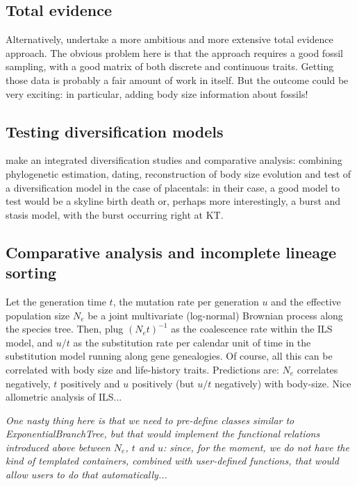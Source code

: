 \documentclass[usletter]{article}
\begin{document}
\subsection{Total evidence}

Alternatively, undertake a more ambitious and more extensive total evidence approach. The obvious problem here is that the approach requires a good fossil sampling, with a good matrix of both discrete and continuous traits. Getting those data is probably a fair amount of work in itself. But the outcome could be very exciting: in particular, adding body size information about fossils!

\subsection{Testing diversification models}

make an integrated diversification studies and comparative analysis: combining phylogenetic estimation, dating, reconstruction of body size evolution and test of a diversification model in the case of placentals: in their case, a good model to test would be a skyline birth death or, perhaps more interestingly, a burst and stasis model, with the burst occurring right at KT.

\subsection{Comparative analysis and incomplete lineage sorting}

Let the generation time $t$, the mutation rate per generation $u$ and the effective population size $N_e$ be a joint multivariate (log-normal) Brownian process along the species tree. Then, plug $(N_e t)^{-1}$ as the coalescence rate within the ILS model, and $u / t$ as the substitution rate per calendar unit of time in the substitution model running along gene genealogies. Of course, all this can be correlated with body size and life-history traits. Predictions are: $N_e$ correlates negatively, $t$ positively and $u$ positively (but $u / t$ negatively) with body-size. Nice allometric analysis of ILS...

\emph{One nasty thing here is that we need to pre-define classes similar to ExponentialBranchTree, but that would implement the functional relations introduced above between $N_e$, $t$ and $u$: since, for the moment, we do not have the kind of templated containers, combined with user-defined functions, that would allow users to do that automatically...}
\end{document}
